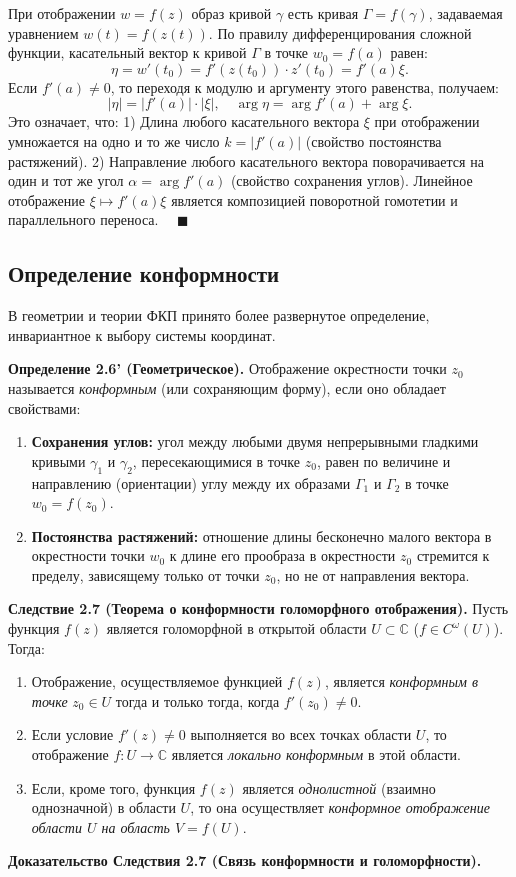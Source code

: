 \documentclass[12pt, a4paper]{article}
\theoremstyle{definition}
\theoremstyle{remark}
\begin{document}
При отображении $w = f(z)$ образ кривой $\gamma$ есть кривая $\Gamma = f(\gamma)$, задаваемая уравнением $w(t) = f(z(t))$. По правилу дифференцирования сложной функции, касательный вектор к кривой $\Gamma$ в точке $w_0 = f(a)$ равен:
\[
\eta = w'(t_0) = f'(z(t_0)) \cdot z'(t_0) = f'(a)\xi.
\]
Если $f'(a) \neq 0$, то переходя к модулю и аргументу этого равенства, получаем:
\[
|\eta| = |f'(a)| \cdot |\xi|, \quad \arg\eta = \arg f'(a) + \arg\xi.
\]
Это означает, что:
1) Длина любого касательного вектора $\xi$ при отображении умножается на одно и то же число $k = |f'(a)|$ (свойство постоянства растяжений).
2) Направление любого касательного вектора поворачивается на один и тот же угол $\alpha = \arg f'(a)$ (свойство сохранения углов). 
Линейное отображение $\xi \mapsto f'(a)\xi$ является композицией поворотной гомотетии и параллельного переноса. $\quad \blacksquare$

\vspace{1em}
\subsection{Определение конформности}

В геометрии и теории ФКП принято более развернутое определение, инвариантное к выбору системы координат.

\textbf{Определение 2.6' (Геометрическое).} Отображение окрестности точки $z_0$ называется \textit{конформным} (или сохраняющим форму), если оно обладает свойствами:
\begin{enumerate}
	\item \textbf{Сохранения углов:} угол между любыми двумя непрерывными гладкими кривыми $\gamma_1$ и $\gamma_2$, пересекающимися в точке $z_0$, равен по величине и направлению (ориентации) углу между их образами $\Gamma_1$ и $\Gamma_2$ в точке $w_0 = f(z_0)$.
	\item \textbf{Постоянства растяжений:} отношение длины бесконечно малого вектора в окрестности точки $w_0$ к длине его прообраза в окрестности $z_0$ стремится к пределу, зависящему только от точки $z_0$, но не от направления вектора.
\end{enumerate}

\vspace{0.5em}
\textbf{Следствие 2.7 (Теорема о конформности голоморфного отображения).} 
Пусть функция $f(z)$ является голоморфной в открытой области $U \subset \mathbb{C}$ ($f \in C^{\omega}(U)$). Тогда:
\begin{enumerate}
	\item Отображение, осуществляемое функцией $f(z)$, является \textit{конформным в точке} $z_0 \in U$ тогда и только тогда, когда $f'(z_0) \neq 0$.
	\item Если условие $f'(z) \neq 0$ выполняется во всех точках области $U$, то отображение $f: U \to \mathbb{C}$ является \textit{локально конформным} в этой области.
	\item Если, кроме того, функция $f(z)$ является \textit{однолистной} (взаимно однозначной) в области $U$, то она осуществляет \textit{конформное отображение области $U$ на область $V = f(U)$}.
\end{enumerate}
\textbf{Доказательство Следствия 2.7 (Связь конформности и голоморфности).} 
\end{document}
